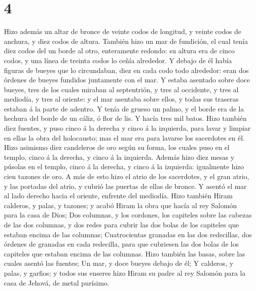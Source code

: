 \hypertarget{section-3}{%
\section{4}\label{section-3}}

 Hizo además un altar de bronce de veinte codos de
longitud, y veinte codos de anchura, y diez codos de altura.
 También hizo un mar de fundición, el cual tenía diez
codos del un borde al otro, enteramente redondo: su altura era de cinco
codos, y una línea de treinta codos lo ceñía alrededor.  Y
debajo de él había figuras de bueyes que lo circundaban, diez en cada
codo todo alrededor: eran dos órdenes de bueyes fundidos juntamente con
el mar.  Y estaba asentado sobre doce bueyes, tres de los
cuales miraban al septentrión, y tres al occidente, y tres al mediodía,
y tres al oriente: y el mar asentaba sobre ellos, y todas sus traseras
estaban á la parte de adentro.  Y tenía de grueso un
palmo, y el borde era de la hechura del borde de un cáliz, ó flor de
lis. Y hacía tres mil batos.  Hizo también diez fuentes, y
puso cinco á la derecha y cinco á la izquierda, para lavar y limpiar en
ellas la obra del holocausto; mas el mar era para lavarse los sacerdotes
en él.  Hizo asimismo diez candeleros de oro según su
forma, los cuales puso en el templo, cinco á la derecha, y cinco á la
izquierda.  Además hizo diez mesas y púsolas en el templo,
cinco á la derecha, y cinco á la izquierda: igualmente hizo cien tazones
de oro.  A más de esto hizo el atrio de los sacerdotes, y
el gran atrio, y las portadas del atrio, y cubrió las puertas de ellas
de bronce.  Y asentó el mar al lado derecho hacia el
oriente, enfrente del mediodía.  Hizo también Hiram
calderos, y palas, y tazones; y acabó Hiram la obra que hacía al rey
Salomón para la casa de Dios;  Dos columnas, y los
cordones, los capiteles sobre las cabezas de las dos columnas, y dos
redes para cubrir las dos bolas de los capiteles que estaban encima de
las columnas;  Cuatrocientas granadas en las dos
redecillas, dos órdenes de granadas en cada redecilla, para que
cubriesen las dos bolas de los capiteles que estaban encima de las
columnas.  Hizo también las basas, sobre las cuales
asentó las fuentes;  Un mar, y doce bueyes debajo de él;
 Y calderos, y palas, y garfios; y todos sus enseres hizo
Hiram su padre al rey Salomón para la casa de Jehová, de metal purísimo.
